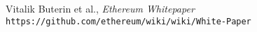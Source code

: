 \begin{thebibliography}{9}

  Vitalik Buterin et al.,
  \emph{Ethereum Whitepaper}
  \verb| https://github.com/ethereum/wiki/wiki/White-Paper |

  
  

\end{thebibliography}